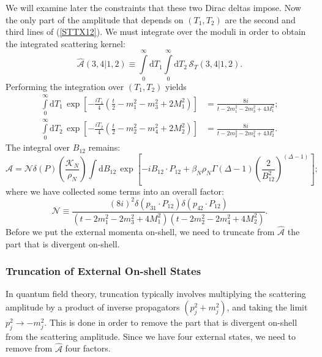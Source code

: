 We will examine later the constraints that these two Dirac deltas impose. Now the only part of the amplitude that depends on $(T_{1}, T_{2})$ are the second and third lines of (\ref{STTX12}). We must integrate over the moduli in order to obtain the integrated scattering kernel:
\begin{equation}
	\widehat{\mathcal{A}}(3, 4| 1, 2) \equiv \int\limits_{0}^{\infty} \mathrm{d}T_{1} \int\limits_{0}^{\infty} \mathrm{d}T_{2} \, \mathcal{S}_{T}(3, 4| 1, 2).
\end{equation}
Performing the integration over $(T_{1}, T_{2})$ yields
\begin{align}
	\int\limits_{0}^{\infty} \mathrm{d}T_{1} \, \exp{\left[ -\frac{i T_{1}}{4} \left( \frac{t}{2} - m_{1}^{2} - m_{3}^{2} + 2 M_{1}^{2}\right) \right]} &= \frac{8i}{t - 2m_{1}^{2} - 2m_{3}^{2} + 4 M_{1}^{2}}; \\
	\int\limits_{0}^{\infty} \mathrm{d}T_{2} \, \exp{\left[ -\frac{i T_{2}}{4} \left( \frac{t}{2} - m_{2}^{2} - m_{4}^{2} + 2 M_{2}^{2}\right) \right]} &= \frac{8i}{t - 2m_{2}^{2} - 2m_{4}^{2} + 4 M_{2}^{2}}.
\end{align}
The integral over $B_{12}$ remains:
\begin{equation}
	\widehat{\mathcal{A}} = \mathcal{N} \delta(P) \left( \frac{\mathcal{K}_{N}}{\rho_{N}} \right) \int \mathrm{d}B_{12} \, \exp{\left[-i B_{12} \cdot P_{12} + \beta_{N} \rho_{N} \Gamma(\Delta - 1) \left( \frac{2}{B_{1 2}^{2}} \right)^{(\Delta - 1)} \right]}; \label{AHatN}
\end{equation}
where we have collected some terms into an overall factor:
\begin{equation}
	\mathcal{N} \equiv \frac{(8i)^{2} \delta(p_{31} \cdot P_{12}) \delta(p_{42} \cdot P_{12})}{(t - 2m_{1}^{2} - 2m_{3}^{2} + 4 M_{1}^{2})(t - 2m_{2}^{2} - 2m_{4}^{2} + 4 M_{2}^{2})}.
\end{equation}
Before we put the external momenta on-shell, we need to truncate from $\widehat{\mathcal{A}}$ the part that is divergent on-shell.
\subsubsection{Truncation of External On-shell States}
In quantum field theory, truncation typically involves multiplying the scattering amplitude by a product of inverse propagators $(p_{j}^{2} + m_{j}^{2})$, and taking the limit $p_{j}^{2} \rightarrow - m_{j}^{2}$. This is done in order to remove the part that is divergent on-shell from the scattering amplitude. Since we have four external states, we need to remove from $\widehat{\mathcal{A}}$ four factors.

